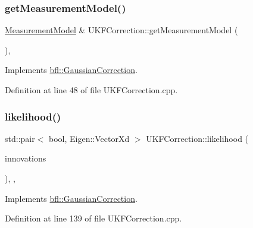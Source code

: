 \subsubsection{\texorpdfstring{get\+Measurement\+Model()}{getMeasurementModel()}}
{\footnotesize\ttfamily \mbox{\hyperlink{classbfl_1_1MeasurementModel}{Measurement\+Model}} \& U\+K\+F\+Correction\+::get\+Measurement\+Model (\begin{DoxyParamCaption}{ }\end{DoxyParamCaption})\hspace{0.3cm}{\ttfamily [override]}, {\ttfamily [virtual]}}



Implements \mbox{\hyperlink{classbfl_1_1GaussianCorrection_af609a22d84cc17a7337486c339ef30c3}{bfl\+::\+Gaussian\+Correction}}.



Definition at line 48 of file U\+K\+F\+Correction.\+cpp.

\mbox{\label{classbfl_1_1UKFCorrection_a3d1317c9f594540e68748c31b22ea31e}} 
\subsubsection{\texorpdfstring{likelihood()}{likelihood()}}
{\footnotesize\ttfamily std\+::pair$<$ bool, Eigen\+::\+Vector\+Xd $>$ U\+K\+F\+Correction\+::likelihood (\begin{DoxyParamCaption}\item[{const Eigen\+::\+Ref$<$ const Eigen\+::\+Matrix\+Xd $>$ \&}]{innovations }\end{DoxyParamCaption})\hspace{0.3cm}{\ttfamily [override]}, {\ttfamily [protected]}, {\ttfamily [virtual]}}



Implements \mbox{\hyperlink{classbfl_1_1GaussianCorrection_a08e227b697ffbaf97c85fb4b17c99fd4}{bfl\+::\+Gaussian\+Correction}}.



Definition at line 139 of file U\+K\+F\+Correction.\+cpp.

\mbox{\label{classbfl_1_1GaussianCorrection_a986b05b149650ea4dd725b10700db57f}} 
